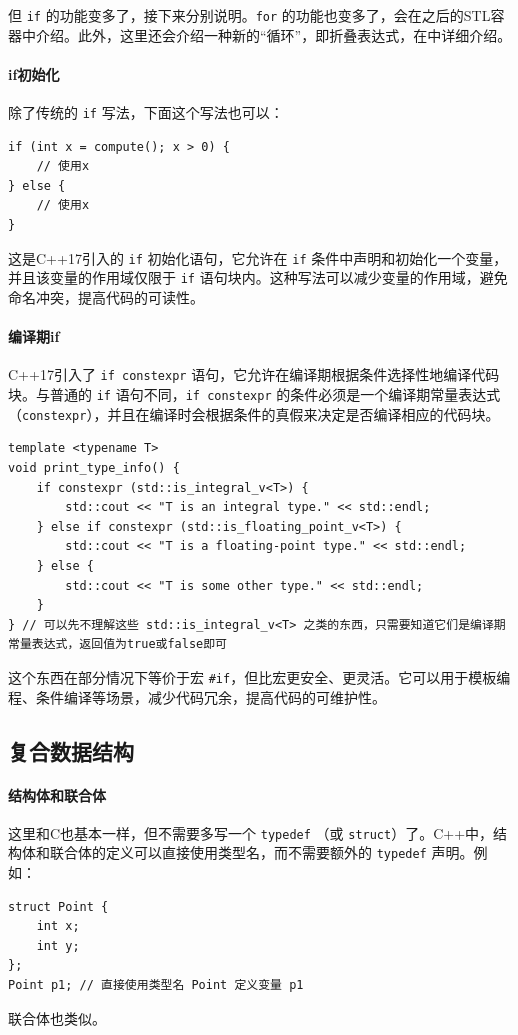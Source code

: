 但 \verb|if| 的功能变多了，接下来分别说明。\verb|for| 的功能也变多了，会在之后的STL容器中介绍。此外，这里还会介绍一种新的“循环”，即折叠表达式，在中详细介绍。

\paragraph{if初始化} 除了传统的 \verb|if| 写法，下面这个写法也可以：
\begin{verbatim}
if (int x = compute(); x > 0) {
    // 使用x
} else {
    // 使用x
}
\end{verbatim}
这是C++17引入的 \verb|if| 初始化语句，它允许在 \verb|if| 条件中声明和初始化一个变量，并且该变量的作用域仅限于 \verb|if| 语句块内。这种写法可以减少变量的作用域，避免命名冲突，提高代码的可读性。

\paragraph{编译期if} C++17引入了 \verb|if constexpr| 语句，它允许在编译期根据条件选择性地编译代码块。与普通的 \verb|if| 语句不同，\verb|if constexpr| 的条件必须是一个编译期常量表达式（\verb|constexpr|），并且在编译时会根据条件的真假来决定是否编译相应的代码块。
\begin{verbatim}
template <typename T>
void print_type_info() {
    if constexpr (std::is_integral_v<T>) {
        std::cout << "T is an integral type." << std::endl;
    } else if constexpr (std::is_floating_point_v<T>) {
        std::cout << "T is a floating-point type." << std::endl;
    } else {
        std::cout << "T is some other type." << std::endl;
    }
} // 可以先不理解这些 std::is_integral_v<T> 之类的东西，只需要知道它们是编译期常量表达式，返回值为true或false即可
\end{verbatim}
这个东西在部分情况下等价于宏 \verb|#if|，但比宏更安全、更灵活。它可以用于模板编程、条件编译等场景，减少代码冗余，提高代码的可维护性。

\subsection{复合数据结构}

\paragraph{结构体和联合体} 这里和C也基本一样，但不需要多写一个 \verb|typedef| （或 \verb|struct|）了。C++中，结构体和联合体的定义可以直接使用类型名，而不需要额外的 \verb|typedef| 声明。例如：
\begin{verbatim}
struct Point {
    int x;
    int y;
};
Point p1; // 直接使用类型名 Point 定义变量 p1
\end{verbatim}
联合体也类似。

